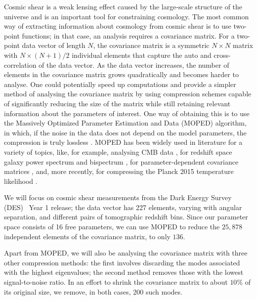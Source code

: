 \documentclass[twocolumn]{\docclass}
\begin{document}
	Cosmic shear is a weak lensing effect caused by the large-scale structure of the universe and is an important tool for constraining cosmology. The most common way of extracting information about cosmology from cosmic shear is to use two-point functions; in that case, an analysis requires a covariance matrix. For a two-point data vector of length $N$, the covariance matrix is a symmetric $N\times N$ matrix with $N\times (N+1)/2$ individual elements that capture the auto and cross-correlation of the data vector. As the data vector increases, the number of elements in the covariance matrix grows quadratically and becomes harder to analyse. One could potentially speed up computations and provide a simpler method of analysing the covariance matrix by using compression schemes capable of significantly reducing the size of the matrix while still retaining relevant information about the parameters of interest. One way of obtaining this is to use the Massively Optimized Parameter Estimation and Data (MOPED) algorithm, in which, if the noise in the data does not depend on the model parameters, the compression is truly lossless \cite{Heavens:2000hjl, Tegmark:1997maa}. MOPED has been widely used in literature for a variety of topics, like, for example, analysing CMB data \cite{Zablocki:2015zcm}, for redshift space galaxy power spectrum and bispectrum \cite{Gualdi:2018mjl}, for parameter-dependent covariance matrices \cite{Heavens:2017smv}, and, more recently, for compressing the Planck 2015 temperature likelihood \cite{Heather:2019d}.
	
	We will focus on cosmic shear measurements from the Dark Energy Survey (DES)~\cite{Troxel:2017xyo} Year 1 release; the data vector has 227 elements, varying with angular separation, and different pairs of tomographic redshift bins. Since our parameter space consists of 16 free parameters, we can use MOPED to reduce the $25,878$ independent elements of the covariance matrix, to only $136$.
	
	Apart from MOPED, we will also be analysing the covariance matrix with three other compression methods: the first involves discarding the modes associated with the highest eigenvalues; the second method removes those with the lowest signal-to-noise ratio. In an effort to shrink the covariance matrix to about $10\%$ of its original size, we remove, in both cases, 200 such modes.
	
\end{document}
